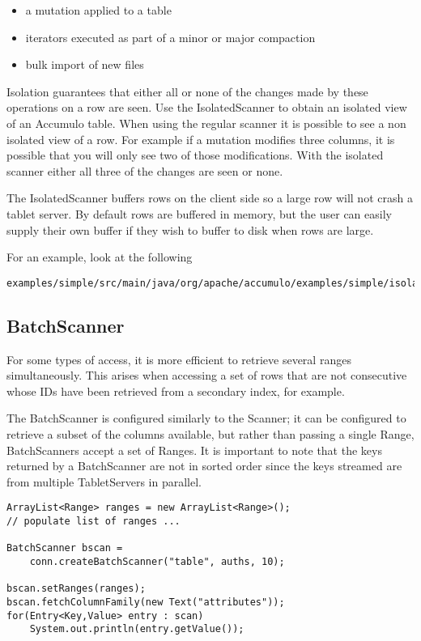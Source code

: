 \begin{itemize}
 \item a mutation applied to a table
 \item iterators executed as part of a minor or major compaction
 \item bulk import of new files
\end{itemize}

Isolation guarantees that either all or none of the changes made by these
operations on a row are seen. Use the IsolatedScanner to obtain an isolated
view of an Accumulo table. When using the regular scanner it is possible to see
a non isolated view of a row. For example if a mutation modifies three
columns, it is possible that you will only see two of those modifications.
With the isolated scanner either all three of the changes are seen or none.

The IsolatedScanner buffers rows on the client side so a large row will not
crash a tablet server. By default rows are buffered in memory, but the user
can easily supply their own buffer if they wish to buffer to disk when rows are
large.

For an example, look at the following

\begingroup\fontsize{8pt}{8pt}\selectfont\begin{verbatim}
examples/simple/src/main/java/org/apache/accumulo/examples/simple/isolation/InterferenceTest.java
\end{verbatim}\endgroup

\subsection{BatchScanner}

For some types of access, it is more efficient to retrieve several ranges
simultaneously. This arises when accessing a set of rows that are not consecutive
whose IDs have been retrieved from a secondary index, for example.

The BatchScanner is configured similarly to the Scanner; it can be configured to
retrieve a subset of the columns available, but rather than passing a single Range,
BatchScanners accept a set of Ranges. It is important to note that the keys returned
by a BatchScanner are not in sorted order since the keys streamed are from multiple
TabletServers in parallel.

\begingroup\fontsize{8pt}{8pt}\selectfont\begin{verbatim}
ArrayList<Range> ranges = new ArrayList<Range>();
// populate list of ranges ...

BatchScanner bscan =
    conn.createBatchScanner("table", auths, 10);

bscan.setRanges(ranges);
bscan.fetchColumnFamily(new Text("attributes"));
for(Entry<Key,Value> entry : scan)
    System.out.println(entry.getValue());
\end{verbatim}\endgroup

